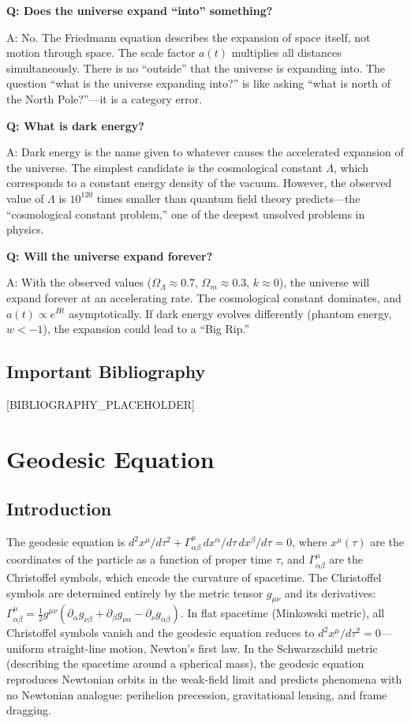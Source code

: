 \documentclass[11pt,openright]{book}
\begin{document}
\textbf{Q: Does the universe expand ``into'' something?}

A: No. The Friedmann equation describes the expansion of space itself, not motion through space. The scale factor $a(t)$ multiplies all distances simultaneously. There is no ``outside'' that the universe is expanding into. The question ``what is the universe expanding into?'' is like asking ``what is north of the North Pole?''---it is a category error.

\textbf{Q: What is dark energy?}

A: Dark energy is the name given to whatever causes the accelerated expansion of the universe. The simplest candidate is the cosmological constant $\Lambda$, which corresponds to a constant energy density of the vacuum. However, the observed value of $\Lambda$ is $10^{120}$ times smaller than quantum field theory predicts---the ``cosmological constant problem,'' one of the deepest unsolved problems in physics.

\textbf{Q: Will the universe expand forever?}

A: With the observed values ($\Omega_\Lambda \approx 0.7$, $\Omega_m \approx 0.3$, $k \approx 0$), the universe will expand forever at an accelerating rate. The cosmological constant dominates, and $a(t) \propto e^{Ht}$ asymptotically. If dark energy evolves differently (phantom energy, $w < -1$), the expansion could lead to a ``Big Rip.''
\section*{Important Bibliography}

[BIBLIOGRAPHY_PLACEHOLDER]


\chapter{Geodesic Equation}

\section*{Introduction}

The geodesic equation is $d^2 x^\mu/d\tau^2 + \Gamma^\mu_{\alpha\beta}\,dx^\alpha/d\tau\,dx^\beta/d\tau = 0$, where $x^\mu(\tau)$ are the coordinates of the particle as a function of proper time $\tau$, and $\Gamma^\mu_{\alpha\beta}$ are the Christoffel symbols, which encode the curvature of spacetime. The Christoffel symbols are determined entirely by the metric tensor $g_{\mu\nu}$ and its derivatives: $\Gamma^\mu_{\alpha\beta} = \frac{1}{2}g^{\mu\nu}(\partial_\alpha g_{\nu\beta} + \partial_\beta g_{\nu\alpha} - \partial_\nu g_{\alpha\beta})$. In flat spacetime (Minkowski metric), all Christoffel symbols vanish and the geodesic equation reduces to $d^2 x^\mu/d\tau^2 = 0$---uniform straight-line motion, Newton's first law. In the Schwarzschild metric (describing the spacetime around a spherical mass), the geodesic equation reproduces Newtonian orbits in the weak-field limit and predicts phenomena with no Newtonian analogue: perihelion precession, gravitational lensing, and frame dragging.
\end{document}
